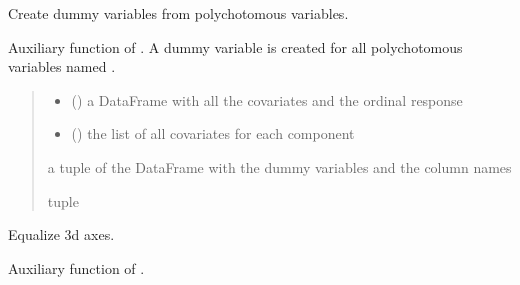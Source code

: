\documentclass[letterpaper,10pt,english]{sphinxmanual}
\begin{document}

\begin{fulllineitems}
\label{\detokenize{cubmods:cubmods.general.dummies2}}
\pysigstartsignatures
{}
\pysigstopsignatures
\sphinxAtStartPar
Create dummy variables from polychotomous variables.

\sphinxAtStartPar
Auxiliary function of .
A dummy variable is created for all polychotomous variables named
.
\begin{quote}\begin{description}
\begin{itemize}
\item {} 
\sphinxAtStartPar
{} () \textendash{} a DataFrame with all the covariates and the ordinal response

\item {} 
\sphinxAtStartPar
{} () \textendash{} the list of all covariates for each component

\end{itemize}

\sphinxAtStartPar
a tuple of the DataFrame with the dummy variables and the column names

\sphinxAtStartPar
tuple

\end{description}\end{quote}

\end{fulllineitems}


\begin{fulllineitems}
\label{\detokenize{cubmods:cubmods.general.equal3d}}
\pysigstartsignatures
{}
\pysigstopsignatures
\sphinxAtStartPar
Equalize 3d axes.

\sphinxAtStartPar
Auxiliary function of .

\end{fulllineitems}
\end{document}
